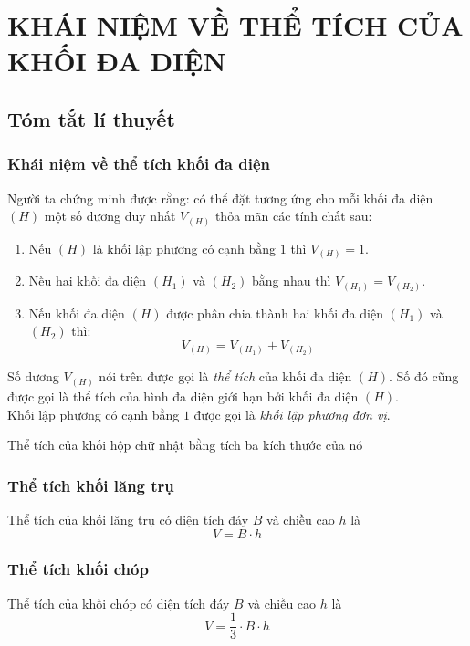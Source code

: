 \section{KHÁI NIỆM VỀ THỂ TÍCH CỦA KHỐI ĐA DIỆN}
\subsection{Tóm tắt lí thuyết}
\subsubsection{Khái niệm về thể tích khối đa diện}
\begin{dn}
Người ta chứng minh được rằng: có thể đặt tương ứng cho mỗi khối đa diện $(H)$ một số dương duy nhất $V_{(H)}$ thỏa mãn các tính chất sau: \begin{enumerate}
\item Nếu $(H)$ là khối lập phương có cạnh bằng $1$ thì $V_{(H)}=1$.
\item Nếu hai khối đa diện $(H_1)$ và $(H_2)$ bằng nhau thì $V_{(H_1)}=V_{(H_2)}$.
\item Nếu khối đa diện $(H)$ được phân chia thành hai khối đa diện $(H_1)$ và $(H_2)$ thì: $$V_{(H)}=V_{(H_1)}+V_{(H_2)}$$
\end{enumerate}
Số dương $V_{(H)}$ nói trên được gọi là \textit{thể tích} của khối đa diện $(H)$. Số đó cũng được gọi là thể tích của hình đa diện giới hạn bởi khối đa diện $(H)$.\\
Khối lập phương có cạnh bằng $1$ được gọi là \textit{khối lập phương đơn vị}.
\end{dn}

\begin{dl}
Thể tích của khối hộp chữ nhật bằng tích ba kích thước của nó
\end{dl}
\subsubsection{Thể tích khối lăng trụ}
\begin{dl}
Thể tích của khối lăng trụ có diện tích đáy $B$ và chiều cao $h$ là $$V=B\cdot h$$
\end{dl}
\subsubsection{Thể tích khối chóp}
\begin{dl}
Thể tích của khối chóp có diện tích đáy $B$ và chiều cao $h$ là $$V=\dfrac{1}{3}\cdot B\cdot h$$
\end{dl}
